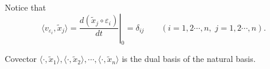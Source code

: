 \documentclass{report}
\begin{document}
Notice that
\[
    \langle v_{\varepsilon_i},\tilde{x}_j\rangle=\left.\frac{d(\tilde{x}_j\circ\varepsilon_i)}{dt}\right|_0=\delta_{ij}\qquad(i=1,2\cdots,n,\;j=1,2\cdots,n).
\]

Covector $\langle\cdot,\tilde{x}_1\rangle,\langle\cdot,\tilde{x}_2\rangle,\cdots,\langle\cdot,\tilde{x}_n\rangle$ is the dual basis of the natural basis.








\end{document}
